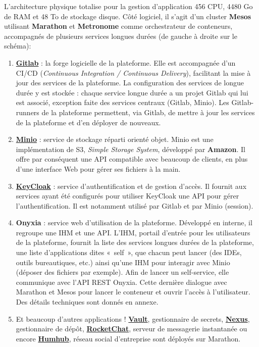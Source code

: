 L'architecture physique totalise pour la gestion d'application 456 CPU, 4480 Go de RAM et 48 To de stockage disque. Côté logiciel, il s'agit d'un cluster \textbf{Mesos} utilisant \textbf{Marathon} et \textbf{Metronome} comme orchestrateur de conteneurs, accompagnés de plusieurs services longues durées (de gauche à droite sur le schéma):
\begin{enumerate}
    \item \href{https://about.gitlab.com/}{\textbf{Gitlab}} : la forge logicielle de la plateforme. Elle est accompagnée d'un CI/CD (\textit{Continuous Integration / Continuous Delivery}), facilitant la mise à jour des services de la plateforme. La configuration des services de longue durée y est stockée : chaque service longue durée a un projet Gitlab qui lui est associé, exception faite des services centraux (Gitlab, Minio). Les Gitlab-runners de la plateforme permettent, via Gitlab, de mettre à jour les services de la plateforme et d'en déployer de nouveaux.
    \vspace{5pt}
    \item \href{https://min.io/}{\textbf{Minio}} : service de stockage réparti orienté objet. Minio est une implémentation de S3, \textit{Simple Storage System}, développé par \textbf{Amazon}. Il offre par conséquent une API compatible avec beaucoup de clients, en plus d'une interface Web pour gérer ses fichiers à la main.
    \vspace{5pt}
    \item \href{https://www.keycloak.org/}{\textbf{KeyCloak}} : service d'authentification et de gestion d'accès. Il fournit aux services ayant été configurés pour utiliser KeyCloak une API pour gérer l'authentification. Il est notamment utilisé par Gitlab et par Minio (session).
    \vspace{5pt}
    \item \textbf{Onyxia} : service web d'utilisation de la plateforme. Développé en interne, il regroupe une IHM et une API. L'IHM, portail d'entrée pour les utilisateurs de la plateforme, fournit la liste des services longues durées de la plateforme, une liste d'applications dites «~self~», que chacun peut lancer (des IDEs, outils bureautiques, etc.) ainsi qu'une IHM pour interagir avec Minio (déposer des fichiers par exemple). Afin de lancer un self-service, elle communique avec l'API REST Onyxia. Cette dernière dialogue avec Marathon et Mesos pour lancer le conteneur et ouvrir l'accès à l'utilisateur. Des détails techniques sont donnés en annexe.
    \vspace{5pt}
    \item Et beaucoup d'autres applications ! \href{https://www.vaultproject.io/}{\textbf{Vault}}, gestionnaire de secrets, \href{https://fr.sonatype.com/nexus-repository-sonatype}{\textbf{Nexus}}, gestionnaire de dépôt, \href{https://rocket.chat/}{\textbf{RocketChat}}, serveur de messagerie instantanée ou encore \href{https://humhub.org}{\textbf{Humhub}}, réseau social d'entreprise sont déployés sur Marathon.
    \newline
\end{enumerate}


